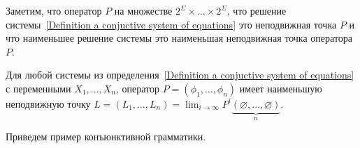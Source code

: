 Заметим, что оператор $P$ на множестве $2^{\Sigma}\times\ldots\times2^{\Sigma}$, что решение системы~\ref{Definition a conjuctive system of equations} это неподвижная точка $P$ и что наименьшее решение системы это наименьшая неподвижная точка оператора $P$.

\begin{theorem}\label{Theorem of a least fixed point solution}
    Для любой системы из определения~\ref{Definition a conjuctive system of equations} с переменными $X_1,\ldots,X_n$, оператор $P = (\phi_1,\ldots,\phi_n)$ имеет наименьшую неподвижную точку $L = (L_1,\ldots,L_n) = \lim_{i\to\infty}P^{i}\underbrace{(\varnothing,\ldots,\varnothing)}_n$.
\end{theorem}

Приведем пример конъюнктивной грамматики.

